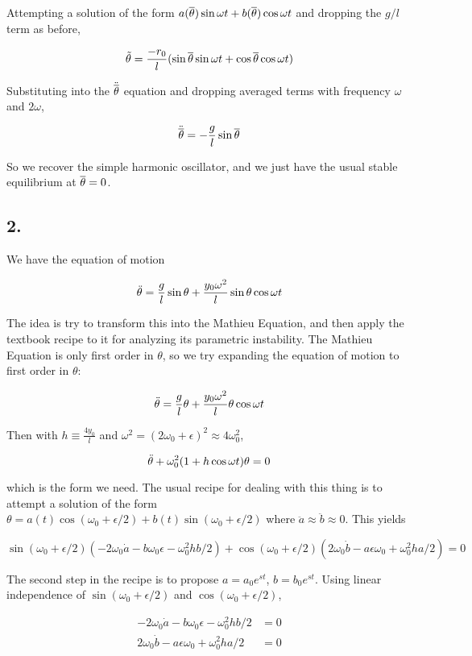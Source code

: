 \documentclass[12pt]{article}
\begin{document}
Attempting a solution of the form \( a(\overline{\theta})\sin\omega t + b(\overline{\theta})\cos\omega t\) and dropping the \(g/l\) term as before,

\[\tilde{\theta} =  \frac{-r_0}{l}(\sin\overline{\theta}\sin\omega t + \cos\overline{\theta}\cos\omega t)
\]

Substituting into the \(\ddot{\overline{\theta}}\) equation and dropping averaged terms with frequency \(\omega\) and \(2\omega\),

\[\ddot{\overline{\theta}} = -\frac{g}{l}\sin\overline{\theta}
\]

So we recover the simple harmonic oscillator, and we just have the usual stable equilibrium at \(\overline{\theta} = 0\).

\pagebreak

\subsection*{2.}

We have the equation of motion

\[\ddot{\theta} = \frac{g}{l}\sin\theta + \frac{y_0\omega^2}{l}\sin\theta\cos\omega t
\]

The idea is try to transform this into the Mathieu  Equation, and then apply the textbook recipe to it for analyzing its parametric instability. The Mathieu Equation is only first order in \(\theta\), so we try expanding the equation of motion to first order in \(\theta\):

\[\ddot{\theta} = \frac{g}{l}\theta + \frac{y_0\omega^2}{l}\theta\cos\omega t
\]

Then with \(h\equiv \frac{4y_0}{l}\) and \(\omega^2 = (2\omega_0+\epsilon)^2 \approx 4\omega_0^2\),

\[\ddot{\theta} + \omega_0^2(1+h\cos\omega t)\theta = 0
\]

\newcommand{\coswne}{\cos(\omega_0 + \epsilon/2)}
\newcommand{\sinwne}{\sin(\omega_0 + \epsilon/2)}

which is the form we need. The usual recipe for dealing with this thing is to attempt a solution of the form \(\theta = a(t)\coswne + b(t)\sinwne \) where \(\ddot{a}\approx\ddot{b}\approx0\). This  yields

\[ \sinwne(-2\omega_0\dot{a} - b\omega_0\epsilon - \omega_0^2hb/2) + \coswne(2\omega_0\dot{b}-a\epsilon\omega_0+\omega_0^2ha/2) = 0
\]

The second step in the recipe is to propose \(a = a_0e^{st}\), \(b = b_0e^{st}\). Using linear independence of \(\sinwne\) and \(\coswne\),

\begin{align*}
-2\omega_0\dot{a} - b\omega_0\epsilon - \omega_0^2hb/2 &= 0 \\
2\omega_0\dot{b}-a\epsilon\omega_0+\omega_0^2ha/2 &= 0 \\
\end{align*}
\end{document}
